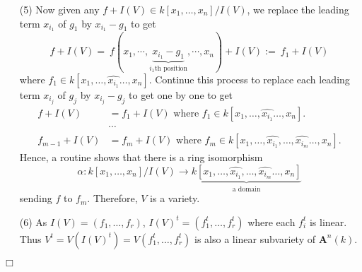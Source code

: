 \documentclass{article}
\begin{document}
\begin{enumerate}
\item[(5)]
  Now given any $f + I(V) \in k[x_1,\ldots,x_n]/I(V)$,
  we replace the leading term $x_{i_1}$ of $g_1$ by $x_{i_1} - g_1$ to get
  \[
    f + I(V)
    = \: f(x_1, \cdots,
      \underbrace{x_{i_1} - g_1}_{\text{$i_1$th position}}, \cdots, x_n) + I(V)
    := \: f_1 + I(V)
  \]
  where $f_1 \in k[x_1,\ldots,\widehat{x_{i_1}}\ldots,x_n]$.
  Continue this process to replace each leading term $x_{i_j}$ of $g_j$ by $x_{i_j} - g_j$ to get
  one by one to get
  \begin{align*}
    f + I(V) &= f_1 + I(V)
      \text{ where } f_1 \in k[x_1,\ldots,\widehat{x_{i_1}}\ldots,x_n]. \\
    & \cdots \\
    f_{m-1} + I(V) &= f_m + I(V)
      \text{ where } f_m \in k[x_1,\ldots,\widehat{x_{i_1}},\ldots,\widehat{x_{i_m}}\ldots,x_n].
  \end{align*}
  Hence, a routine shows that there is a ring isomorphism
  \[
    \alpha: k[x_1,\ldots,x_n]/I(V) \to
    \underbrace{k[x_1,\ldots,\widehat{x_{i_1}},\ldots,\widehat{x_{i_m}}\ldots,x_n]}_{\text{a domain}}
  \]
  sending $f$ to $f_m$.
  Therefore, $V$ is a variety.

\item[(6)]
  As $I(V) = (f_1, \ldots, f_r)$,
  $I(V)^{t} = (f_1^{t}, \ldots, f_r^{t})$ where each $f_i^{t}$ is linear.
  Thus $V^{t} = V(I(V)^{t}) = V(f_1^{t}, \ldots, f_r^{t})$
  is also a linear subvariety of $\mathbf{A}^n(k)$.
\end{enumerate}
$\Box$ \\
\end{document}
